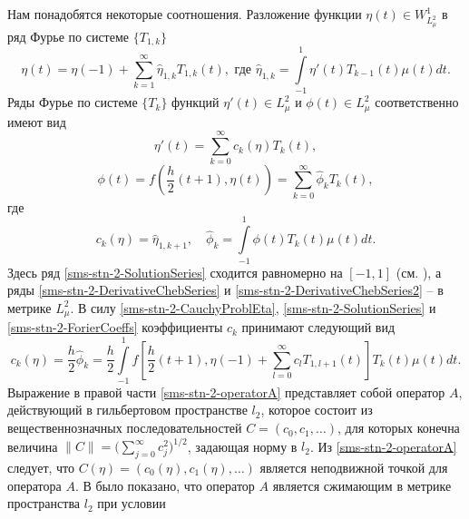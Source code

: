 
Нам понадобятся некоторые соотношения. Разложение функции $\eta(t)\in W_{L_\mu^2}^1$ в ряд Фурье по системе $\{T_{1,k}\}$
\begin{equation}\label{sms-stn-2-SolutionSeries}
\eta(t)=\eta(-1)+\sum\limits_{k=1}^{\infty}\hat\eta_{1,k} T_{1,k}(t),\text{ где } \hat\eta_{1,k}=\int\limits_{-1}^1\eta'(t)T_{k-1}(t)\mu(t)dt.
\end{equation}
Ряды Фурье по системе $\{T_k\}$ функций $\eta'(t)\in L^2_\mu$ и $\phi(t)\in L^2_\mu$ соответственно имеют вид 
\begin{equation}\label{sms-stn-2-DerivativeChebSeries}
\eta'(t)=\sum\limits_{k=0}^{\infty}c_k(\eta) T_k(t),
\end{equation}
\begin{equation}\label{sms-stn-2-DerivativeChebSeries2}
\phi(t)=f\left(\frac h2(t+1),\eta(t)\right)=\sum\limits_{k=0}^{\infty}\hat\phi_k T_k(t),
\end{equation}
где
\begin{equation}\label{sms-stn-2-ForierCoeffs}
c_k(\eta)=\hat\eta_{1,k+1},\quad\hat\phi_k=\int\limits_{-1}^1\phi(t)T_k(t)\mu(t)dt.
\end{equation}
Здесь ряд \eqref{sms-stn-2-SolutionSeries} сходится равномерно на $[-1,1]$ (см. \cite{RamShaIzv}), а ряды \eqref{sms-stn-2-DerivativeChebSeries} и \eqref{sms-stn-2-DerivativeChebSeries2} -- в метрике $L^2_\mu$. В силу \eqref{sms-stn-2-CauchyProblEta}, \eqref{sms-stn-2-SolutionSeries} и \eqref{sms-stn-2-ForierCoeffs} коэффициенты $c_k$ принимают следующий вид
\begin{equation}\label{sms-stn-2-operatorA}
c_k(\eta)=\frac h2\hat\phi_k=\frac h2\int\limits_{-1}^1f\left[\frac h2(t+1),\eta(-1)+\sum\limits_{l=0}^{\infty}c_l T_{1,l+1}(t)\right]T_k(t)\mu(t)dt.
\end{equation}
Выражение в правой части \eqref{sms-stn-2-operatorA} представляет собой оператор $A$, действующий в гильбертовом пространстве $l_2$, которое состоит из вещественнозначных последовательностей $C=(c_0,c_1,\ldots)$, для которых конечна величина $\|C\|=\bigl(\sum_{j=0}^\infty c_j^2)^{1/2}$, задающая норму в $l_2$. Из \eqref{sms-stn-2-operatorA} следует, что $C(\eta) = (c_0(\eta),c_1(\eta),\dots)$ является неподвижной точкой для оператора $A$. В \cite{sms-stn-2-PolOrtPorSobChebUrav} было показано, что оператор $A$ является сжимающим в метрике пространства $l_2$ при условии
